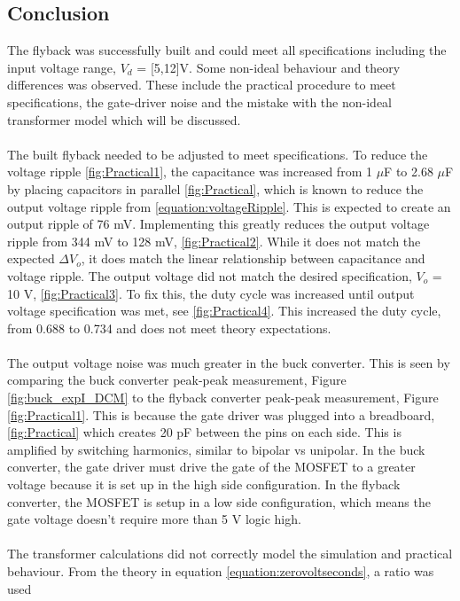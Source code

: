 \documentclass[12pt,twoside]{scrartcl}
\begin{document}
\newpage
\subsection{Conclusion}
The flyback was successfully built and could meet all specifications 
including the input voltage range, $V_d$ = [5,12]V. 
Some non-ideal behaviour and theory differences was observed. 
These include the practical procedure to meet specifications, the gate-driver noise and the mistake with the
non-ideal transformer model which will be discussed. 
\\\\
The built flyback needed to be adjusted to meet specifications. To reduce the voltage ripple \ref{fig:Practical1}, the capacitance was increased 
from 1 $\mu$F to 2.68 $\mu$F by placing capacitors in parallel \ref{fig:Practical}, which is known to reduce
the output voltage ripple from \ref{equation:voltageRipple}. This is 
expected to create an output ripple of 76 mV. Implementing this greatly reduces the output voltage ripple from 344 mV to 128 mV, 
\ref{fig:Practical2}. While it does not match the expected $\Delta V_o$, it does match the linear 
relationship between capacitance and voltage ripple. The output voltage did not match the desired 
specification, $V_o$ = 10 V, \ref{fig:Practical3}. To fix this, the duty cycle was increased
until output voltage specification was met, see \ref{fig:Practical4}. This increased the duty cycle,
from 0.688 to 0.734 and does not meet theory expectations. 
\\\\
The output voltage noise was much greater in the buck converter. This is seen by comparing the buck converter peak-peak measurement, Figure \ref{fig:buck_expI_DCM}
to the flyback converter peak-peak measurement, Figure \ref{fig:Practical1}.  
This is because the gate driver was plugged into a breadboard, \ref{fig:Practical} which creates 20 pF between the pins on each side. This is amplified 
by switching harmonics, similar to bipolar vs unipolar. In the buck converter,
the gate driver must drive the gate of the MOSFET to a greater voltage because it is set up in the high side configuration. 
In the flyback converter, the MOSFET is setup in a low side configuration, which means the gate voltage doesn't require more than 5 V logic high.
\\\\
The transformer calculations did not correctly model the simulation and practical behaviour. From the theory in equation \ref{equation:zerovoltseconds}, a ratio was used 
\end{document}
